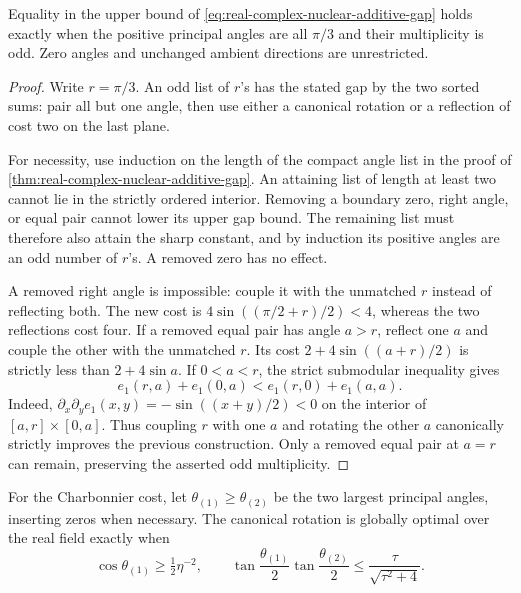 \begin{corollary}
\label{cor:real-complex-nuclear-gap-equality}
Equality in the upper bound of
\cref{eq:real-complex-nuclear-additive-gap} holds exactly when the
positive principal angles are all $\pi/3$ and their multiplicity is odd.
Zero angles and unchanged ambient directions are unrestricted.
\end{corollary}

\begin{proof}
Write $r=\pi/3$. An odd list of $r$'s has the stated gap by the two
sorted sums: pair all but one angle, then use either a canonical rotation
or a reflection of cost two on the last plane.

For necessity, use induction on the length of the compact angle list in
the proof of \cref{thm:real-complex-nuclear-additive-gap}. An attaining
list of length at least two cannot lie in the strictly ordered interior.
Removing a boundary zero, right angle, or equal pair cannot lower its
upper gap bound. The remaining list must therefore also attain the sharp
constant, and by induction its positive angles are an odd number of $r$'s.
A removed zero has no effect.

A removed right angle is impossible: couple it with the unmatched $r$
instead of reflecting both. The new cost is
$4\sin((\pi/2+r)/2)<4$, whereas the two reflections cost four.
If a removed equal pair has angle $a>r$, reflect one $a$ and couple the
other with the unmatched $r$. Its cost
$2+4\sin((a+r)/2)$ is strictly less than $2+4\sin a$.
If $0<a<r$, the strict submodular inequality gives
\[
 e_1(r,a)+e_1(0,a)<e_1(r,0)+e_1(a,a).
\]
Indeed, $\partial_x\partial_y e_1(x,y)=-\sin((x+y)/2)<0$
on the interior of $[a,r]\times[0,a]$.
Thus coupling $r$ with one $a$ and rotating the other $a$ canonically
strictly improves the previous construction. Only a removed equal pair
at $a=r$ can remain, preserving the asserted odd multiplicity.
\end{proof}

\begin{corollary}
\label{cor:real-smoothed-canonical-top-two}
For the Charbonnier cost, let $\theta_{(1)}\geq\theta_{(2)}$ be the
two largest principal angles, inserting zeros when necessary.
The canonical rotation is globally optimal over the real field exactly
when
\[
 \cos\theta_{(1)}\geq\tfrac12\eta^{-2},\qquad
 \tan\frac{\theta_{(1)}}2\tan\frac{\theta_{(2)}}2
       \leq\frac{\tau}{\sqrt{\tau^2+4}}.
\]
\end{corollary}

